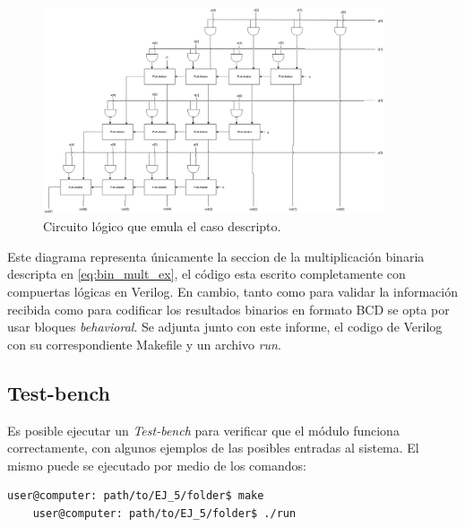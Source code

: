 \begin{figure}[H]
    \centering
        \includegraphics[width=0.9\textwidth]{./EJ_5/circuito_con_FA.png}
        \caption{\label{fig:circuito_con_FA}Circuito l\'ogico que emula el caso descripto.}        
\end{figure}

Este diagrama representa \'unicamente la seccion de la multiplicaci\'on binaria descripta en \ref{eq:bin_mult_ex}, el c\'odigo esta escrito completamente con compuertas l\'ogicas en Verilog.
En cambio, tanto como para validar la informaci\'on recibida como para codificar los resultados binarios en formato BCD se opta por usar bloques \textit{behavioral}.
Se adjunta junto con este informe, el codigo de Verilog con su correspondiente Makefile y un archivo \textit{run}.

\subsection{Test-bench}
Es posible ejecutar un \textit{Test-bench} para verificar que el m\'odulo funciona correctamente, con algunos ejemplos de las posibles entradas al sistema. 
El mismo puede se ejecutado por medio de los comandos:
\begin{lstlisting}[language=bash]
    user@computer: path/to/EJ_5/folder$ make
    user@computer: path/to/EJ_5/folder$ ./run
\end{lstlisting}